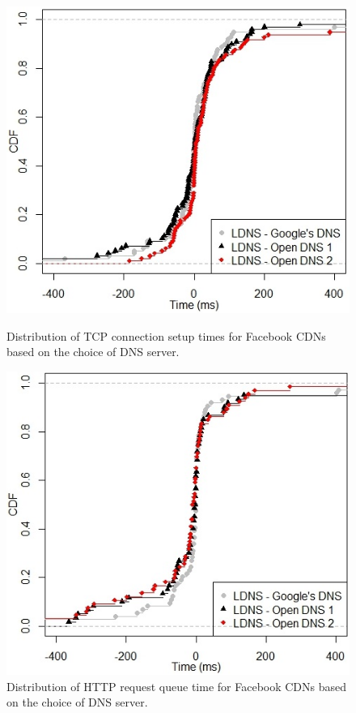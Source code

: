 \documentclass{llncs}
\begin{document}
\begin{figure}
  \includegraphics[width=\linewidth]{figures/dns_selection_avg_conn_setup_time_facebook}
  \caption{Distribution of TCP connection setup times for Facebook CDNs based on the choice of DNS server.}
  \label{fig:dns_selection_avg_conn_setup_time_facebook}
\endminipage\hfill
{}%
 \includegraphics[width=\linewidth]{figures/dns_server_selection_min_request_queue_facebook}
  \caption{Distribution of HTTP request queue time for Facebook CDNs based on the choice of DNS server.}
  \label{fig:dns_server_selection_min_request_queue_facebook}
\endminipage
\end{figure}
\end{document}
